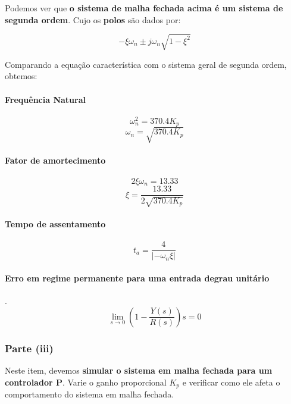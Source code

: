 \documentclass[a4paper, 12pt]{article}
\begin{document}
Podemos ver que \textbf{o sistema de malha fechada acima é um sistema de segunda ordem}. Cujo os \textbf{polos} são dados por:

\begin{equation}
    -\xi\omega_n \pm j\omega_n\sqrt{1-\xi^2}
\end{equation}

Comparando a equação característica com o sistema geral de segunda ordem, obtemos:

\paragraph{Frequência Natural}
\begin{equation}
    \omega_n^2=370.4K_p
\end{equation}
\begin{equation}
    \omega_n=\sqrt{370.4K_p}
\end{equation}

\paragraph{Fator de amortecimento}
\begin{equation}
    2\xi\omega_n=13.33
\end{equation}
\begin{equation}
    \xi=\frac{13.33}{2\sqrt{370.4K_p}}
\end{equation}

\paragraph{Tempo de assentamento} 
\begin{equation}
    t_a=\frac{4}{|-\omega_n\xi|}
\end{equation}

\paragraph{Erro em regime permanente para uma entrada degrau unitário}. 
\begin{equation}
    \lim_{s\to 0}(1-\frac{Y(s)}{R(s)})s=0
\end{equation}


\subsubsection{Parte (iii)}
Neste item, devemos \textbf{simular o  sistema em malha fechada para um controlador P}. Varie o ganho proporcional $K_p$ e verificar como ele afeta o comportamento do sistema em malha fechada.
\end{document}
